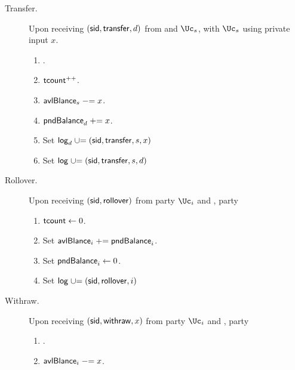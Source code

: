 \begin{functionality}
\begin{description}
		
		\item[Transfer.]    Upon receiving  $(\mathsf{sid},\mathsf{transfer},d)$ from  \Cc and  $\Uc_s$, with  $\Uc_s$ using private input $x$. 
		
	
		\begin{enumerate}
			\item {}.
			
				\item $\mathsf{tcount}^{++}$.
				
				
			\item $\mathsf{avlBlance}_s \mathrel{-}= x$.
			
			\item   $\mathsf{pndBalance}_d \mathrel{+}= x$.
			
			\item Set $\mathsf{log}_d \mathrel{\cup}= {(\mathsf{sid},\mathsf{transfer},s,x)}$
			
			\item Set $\mathsf{log} \mathrel{\cup}= {(\mathsf{sid},\mathsf{transfer},s,d)}$
			
		\end{enumerate}
		
		\item[Rollover.]     Upon receiving $(\mathsf{sid},\mathsf{rollover})$ from  party $\Uc_i$ and \Cc,  party \Cc
		
		\begin{enumerate}
			
			
			\item $\mathsf{tcount} \leftarrow 0$.
			
			
			\item Set $\mathsf{avlBlance}_i  \mathrel{+}= \mathsf{pndBalance}_i$.
			
			\item Set $\mathsf{pndBalance}_i  \leftarrow 0$.
			
			\item Set $\mathsf{log} \mathrel{\cup}= (\mathsf{sid},\mathsf{rollover},i)$
			
			
		\end{enumerate}

		
			\item[Withraw.]     Upon receiving $(\mathsf{sid},\mathsf{withraw},x)$ from  party $\Uc_i$ and \Cc,  party \Cc
		
		\begin{enumerate}
			
			
			 \item {}.
			
			\item $\mathsf{avlBlance}_i \mathrel{-}= x$.
			

\end{enumerate}
\end{description}
\end{functionality}
